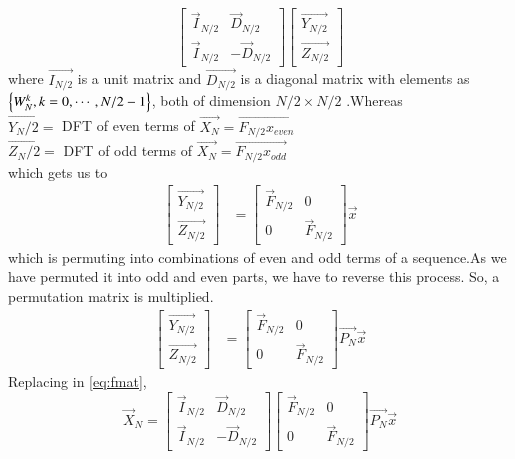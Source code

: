 \documentclass[journal,12pt,twocolumn]{IEEEtran}
\renewcommand\thesection{\arabic{section}}
\begin{document}
\begin{enumerate}[label=\arabic*.,ref=\thesection.\theenumi]
\begin{equation}
\begin{bmatrix}
			\vec{I}_{N/2} & \vec{D}_{N/2} \\
			\vec{I}_{N/2} & -\vec{D}_{N/2}
		\end{bmatrix}
		\begin{bmatrix}
			\vec{Y_{N/2}}\\\vec{Z_{N/2}}
		\end{bmatrix}
	\end{equation}
	where $\vec{I_{N/2}}$ is a unit matrix and $\vec{D_{N/2}}$ is a diagonal matrix with elements as $\left\{W_N^{k},k=0,\cdots,N/2-1\right\}$, both of dimension $N/2 \times N/2$ .Whereas \\
	$\vec{Y_N/2}=$ DFT of even terms of $\vec{X_N}=\vec{F_{N/2}x_{even}}$\\
	$\vec{Z_N/2}=$ DFT of odd terms of $\vec{X_N}=\vec{F_{N/2}x_{odd}}$\\
	which gets us to \\
	\begin{align}
		\begin{bmatrix}
			\vec{Y_{N/2}}\\\vec{Z_{N/2}}
		\end{bmatrix}&=
		\begin{bmatrix}
			\vec{F}_{N/2} & 0 \\
			0 & \vec{F}_{N/2}
		\end{bmatrix}\vec{x}
	\end{align}
	which is permuting into combinations of even and odd terms of a sequence.As we have permuted it into odd and even parts, we have to reverse this process. So, a permutation matrix is multiplied.
	\begin{align}
		\begin{bmatrix}
			\vec{Y_{N/2}}\\\vec{Z_{N/2}}
		\end{bmatrix}&=
		\begin{bmatrix}
			\vec{F}_{N/2} & 0 \\
			0 & \vec{F}_{N/2}
		\end{bmatrix}\vec{P_N}\vec{x}
	\end{align}
	Replacing in \eqref{eq:fmat},
	\begin{equation}
		\vec{X}_{N}=
		\begin{bmatrix}
			\vec{I}_{N/2} & \vec{D}_{N/2} \\
			\vec{I}_{N/2} & -\vec{D}_{N/2}
		\end{bmatrix}
		\begin{bmatrix}
			\vec{F}_{N/2} & 0 \\
			0 & \vec{F}_{N/2}
		\end{bmatrix}\vec{P_N}\vec{x}

\end{equation}
\end{enumerate}
\end{document}
